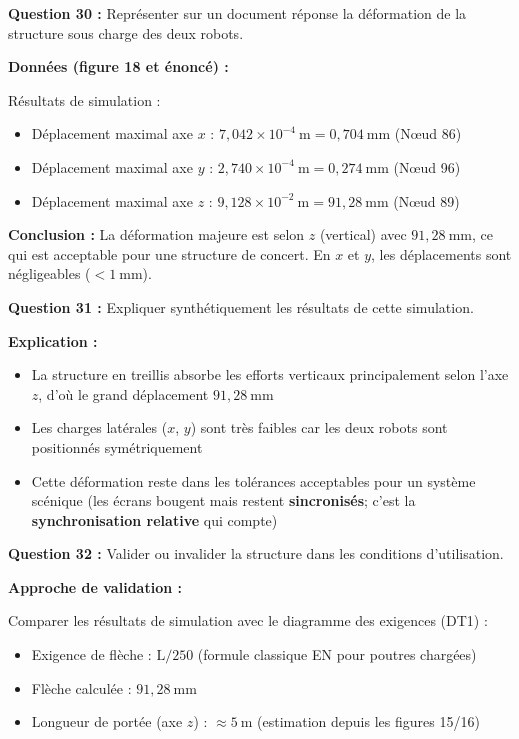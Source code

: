 \documentclass[12pt,a4paper,twoside]{article}
\begin{document}
\begin{correction}
  \textbf{Question 30 :} Représenter sur un document réponse la déformation de la structure sous charge des deux robots.

  \textbf{Données (figure 18 et énoncé) :}

  Résultats de simulation :
  \begin{itemize}
    \item Déplacement maximal axe $x$ : $7{,}042 \times 10^{-4}~\text{m} = 0{,}704~\text{mm}$ (Nœud 86)
    \item Déplacement maximal axe $y$ : $2{,}740 \times 10^{-4}~\text{m} = 0{,}274~\text{mm}$ (Nœud 96)
    \item Déplacement maximal axe $z$ : $9{,}128 \times 10^{-2}~\text{m} = 91{,}28~\text{mm}$ (Nœud 89)
  \end{itemize}

  \textbf{Conclusion :} La déformation majeure est selon $z$ (vertical) avec $91{,}28~\text{mm}$, ce qui est acceptable pour une structure de concert. En $x$ et $y$, les déplacements sont négligeables ($< 1~\text{mm}$).

  \textbf{Question 31 :} Expliquer synthétiquement les résultats de cette simulation.

  \textbf{Explication :}

  \begin{itemize}
    \item La structure en treillis absorbe les efforts verticaux principalement selon l'axe $z$, d'où le grand déplacement $91{,}28~\text{mm}$
    \item Les charges latérales ($x$, $y$) sont très faibles car les deux robots sont positionnés symétriquement
    \item Cette déformation reste dans les tolérances acceptables pour un système scénique (les écrans bougent mais restent \textbf{sincronisés}; c'est la \textbf{synchronisation relative} qui compte)
  \end{itemize}

  \textbf{Question 32 :} Valider ou invalider la structure dans les conditions d'utilisation.

  \textbf{Approche de validation :}

  Comparer les résultats de simulation avec le diagramme des exigences (DT1) :
  \begin{itemize}
    \item Exigence de flèche : $\text{L} / 250$ (formule classique EN pour poutres chargées)
    \item Flèche calculée : $91{,}28~\text{mm}$
    \item Longueur de portée (axe $z$) : $\approx 5~\text{m}$ (estimation depuis les figures 15/16)
  \end{itemize}


\end{correction}
\end{document}
